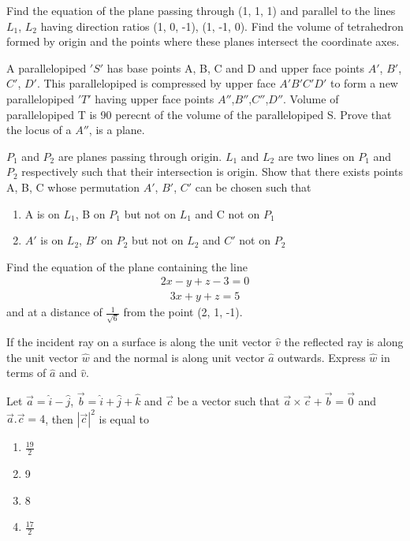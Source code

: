 \item Find the equation of the plane passing through (1, 1, 1) and parallel to the lines $L_1$, $L_2$ having direction ratios (1, 0, -1), (1, -1, 0). Find the volume of tetrahedron formed by origin and the points where these planes intersect the coordinate axes.

\item A parallelopiped $'S'$ has base points A, B, C and D and upper face points $A'$, $B'$, $C'$, $D'$. This parallelopiped is compressed by upper face $A'B'C'D'$ to form a new parallelopiped $'T'$ having upper face points $A''$,$B''$,$C''$,$D''$. Volume of parallelopiped T is 90 perecnt of the volume of the parallelopiped S. Prove that the locus of a $A''$, is a plane.

\item $P_1$ and $P_2$ are planes passing through origin. $L_1$ and $L_2$ are two lines on $P_1$ and $P_2$ respectively such that their intersection is origin. Show that there exists points A, B, C whose permutation $A'$, $B'$, $C'$ can be chosen such that
\begin{enumerate}
\item A is on $L_1$, B on $P_1$ but not on $L_1$ and C not on $P_1$
\item $A'$ is on $L_2$, $B'$ on $P_2$ but not on $L_2$ and $C'$ not on $P_2$
\end{enumerate} 

\item Find the equation of the plane containing the line
\begin{align*}
2x - y + z - 3 = 0
\end{align*}
\begin{align*}
3x + y + z = 5
\end{align*}
 and at a distance of $\frac{1}{\sqrt{6}}$ from the point (2, 1, -1).
 
\item If the incident ray on a surface is along the unit vector $\hat{v}$ the reflected ray is along the unit vector 
 $\hat{w}$ and the normal is along unit vector $\hat{a}$ outwards. Express $\hat{w}$ in terms of $\hat{a}$ and $\hat{v}$.
 
\item Let $\overrightarrow{a} = \hat{i} - \hat{j}$, $\overrightarrow{b} = \hat{i} + \hat{j} + \hat{k}$  and 
$\overrightarrow{c}$ be a vector such that $\overrightarrow{a} \times \overrightarrow{c} + \overrightarrow{b} = \overrightarrow{0}$ and $\overrightarrow{a}.\overrightarrow{c} = 4$, then $|\overrightarrow{c}|^2$ is equal to
\begin{enumerate}
\item $\frac{19}{2}$
\item 9
\item 8
\item $\frac{17}{2}$
\end{enumerate}

